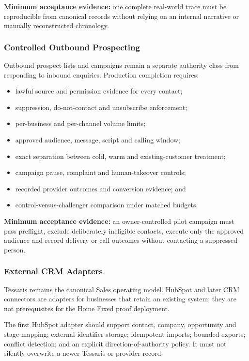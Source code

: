 \textbf{Minimum acceptance evidence:} one complete real-world trace must be
reproducible from canonical records without relying on an internal narrative or
manually reconstructed chronology.

\subsubsection{Controlled Outbound Prospecting}

Outbound prospect lists and campaigns remain a separate authority class from
responding to inbound enquiries.  Production completion requires:

\begin{itemize}[leftmargin=*]
  \item lawful source and permission evidence for every contact;
  \item suppression, do-not-contact and unsubscribe enforcement;
  \item per-business and per-channel volume limits;
  \item approved audience, message, script and calling window;
  \item exact separation between cold, warm and existing-customer treatment;
  \item campaign pause, complaint and human-takeover controls;
  \item recorded provider outcomes and conversion evidence; and
  \item control-versus-challenger comparison under matched budgets.
\end{itemize}

\textbf{Minimum acceptance evidence:} an owner-controlled pilot campaign must
pass preflight, exclude deliberately ineligible contacts, execute only the
approved audience and record delivery or call outcomes without contacting a
suppressed person.

\subsubsection{External CRM Adapters}

Tessaris remains the canonical Sales operating model.  HubSpot and later CRM
connectors are adapters for businesses that retain an existing system; they are
not prerequisites for the Home Fixed proof deployment.

The first HubSpot adapter should support contact, company, opportunity and stage
mapping; external identifier storage; idempotent imports; bounded exports;
conflict detection; and an explicit direction-of-authority policy.  It must not
silently overwrite a newer Tessaris or provider record.

